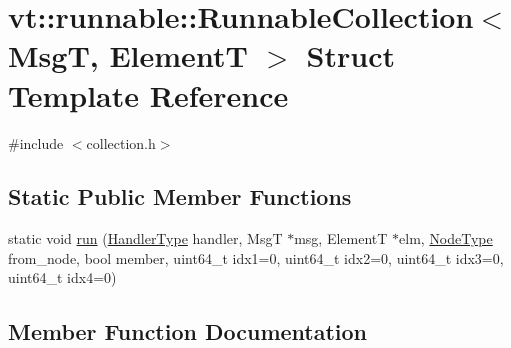 \hypertarget{structvt_1_1runnable_1_1_runnable_collection}{}\section{vt\+:\+:runnable\+:\+:Runnable\+Collection$<$ MsgT, ElementT $>$ Struct Template Reference}
\label{structvt_1_1runnable_1_1_runnable_collection}


{\ttfamily \#include $<$collection.\+h$>$}

\subsection*{Static Public Member Functions}
\begin{DoxyCompactItemize}
\item 
static void \hyperlink{structvt_1_1runnable_1_1_runnable_collection_ab5582d6736066838db9a5f867c1626f7}{run} (\hyperlink{namespacevt_af64846b57dfcaf104da3ef6967917573}{Handler\+Type} handler, MsgT $\ast$msg, ElementT $\ast$elm, \hyperlink{namespacevt_a866da9d0efc19c0a1ce79e9e492f47e2}{Node\+Type} from\+\_\+node, bool member, uint64\+\_\+t idx1=0, uint64\+\_\+t idx2=0, uint64\+\_\+t idx3=0, uint64\+\_\+t idx4=0)
\end{DoxyCompactItemize}


\subsection{Member Function Documentation}
\mbox{\label{structvt_1_1runnable_1_1_runnable_collection_ab5582d6736066838db9a5f867c1626f7}} 
